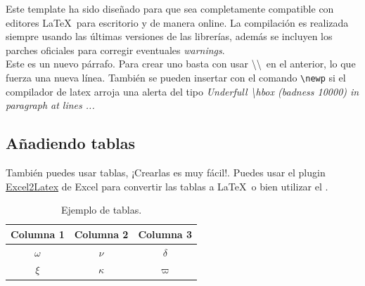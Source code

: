 
	Este template \cite{template} ha sido diseñado para que sea completamente compatible con editores \LaTeX\ para escritorio y de manera online. La compilación es realizada siempre usando las últimas versiones de las librerías, además se incluyen los parches oficiales para corregir eventuales \textit{warnings}. \\

	Este es un nuevo párrafo. Para crear uno basta con usar \textbackslash\textbackslash\ en el anterior, lo que fuerza una nueva línea. También se pueden insertar con el comando \texttt{\textbackslash newp} si el compilador de latex arroja una alerta del tipo \textit{Underfull \textbackslash hbox (badness 10000) in paragraph at lines ...}

\subsection{Añadiendo tablas}

	También puedes usar tablas, ¡Crearlas es muy fácil!. Puedes usar el plugin \href{https://www.ctan.org/tex-archive/support/excel2latex}{Excel2Latex} \cite{excel2latex} de Excel para convertir las tablas a \LaTeX\ o bien utilizar el  \cite{tablesgenerator}.

	\begin{table}[H]
		\centering
		\caption{Ejemplo de tablas.}
		\begin{tabular}{ccc}
			\hline
			\textbf{Columna 1} & \textbf{Columna 2} & \textbf{Columna 3} \bigstrut\\
			\hline
			$\omega$ & $\nu$ & $\delta$ \bigstrut[t]\\
			$\xi$ & $\kappa$ & $\varpi$ \bigstrut[b] \\
			\hline
		\end{tabular}
		\label{tab:tabla-1}
	\end{table}


\clearpage
